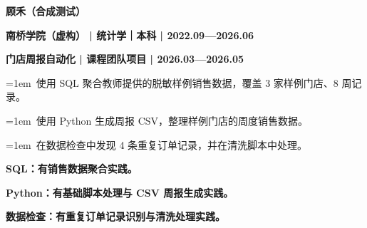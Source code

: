 \documentclass[11pt,a4paper,fontset=fandol]{ctexart}
\begin{document}
{\LARGE\bfseries 顾禾（合成测试）}\par
\par\medskip{}\par\nobreak
\begin{minipage}{\linewidth}
\textbf{南桥学院（虚构） | 统计学｜本科 | 2022.09—2026.06}\par
\end{minipage}\par
\par\medskip{}\par\nobreak
\begin{minipage}{\linewidth}
\textbf{门店周报自动化 | 课程团队项目 | 2026.03—2026.05}\par
\noindent\hangindent=1em\textbullet\ 使用 SQL 聚合教师提供的脱敏样例销售数据，覆盖 3 家样例门店、8 周记录。\par
\end{minipage}\par
\noindent\hangindent=1em\textbullet\ 使用 Python 生成周报 CSV，整理样例门店的周度销售数据。\par
\noindent\hangindent=1em\textbullet\ 在数据检查中发现 4 条重复订单记录，并在清洗脚本中处理。\par
\par\medskip{}\par\nobreak
\begin{minipage}{\linewidth}
\textbf{SQL：有销售数据聚合实践。}\par
\end{minipage}\par
\begin{minipage}{\linewidth}
\textbf{Python：有基础脚本处理与 CSV 周报生成实践。}\par
\end{minipage}\par
\begin{minipage}{\linewidth}
\textbf{数据检查：有重复订单记录识别与清洗处理实践。}\par
\end{minipage}\par
\end{document}

